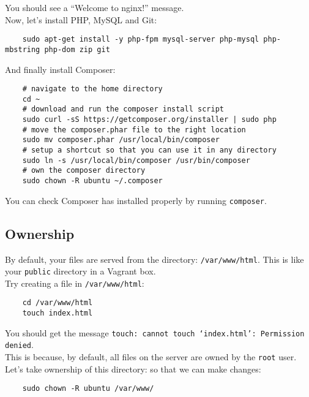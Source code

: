 You should see a ``Welcome to nginx!'' message.
\\

Now, let's install PHP,  MySQL and Git:

\begin{verbatim}
    sudo apt-get install -y php-fpm mysql-server php-mysql php-mbstring php-dom zip git
\end{verbatim}

And finally install Composer:

\begin{verbatim}
    # navigate to the home directory
    cd ~
    # download and run the composer install script
    sudo curl -sS https://getcomposer.org/installer | sudo php
    # move the composer.phar file to the right location
    sudo mv composer.phar /usr/local/bin/composer
    # setup a shortcut so that you can use it in any directory
    sudo ln -s /usr/local/bin/composer /usr/bin/composer
    # own the composer directory
    sudo chown -R ubuntu ~/.composer
\end{verbatim}

You can check Composer has installed properly by running \texttt{composer}.


\subsection{Ownership}

By default, your files are served from the directory: \texttt{/var/www/html}. This is like your \texttt{public} directory in a Vagrant box.
\\

Try creating a file in \texttt{/var/www/html}:

\begin{verbatim}
    cd /var/www/html
    touch index.html
\end{verbatim}

You should get the message \texttt{touch: cannot touch `index.html': Permission denied}.
\\

This is because, by default, all files on the server are owned by the \texttt{root} user.
\\

Let's take ownership of this directory: so that we can make changes:

\begin{verbatim}
    sudo chown -R ubuntu /var/www/
\end{verbatim}

